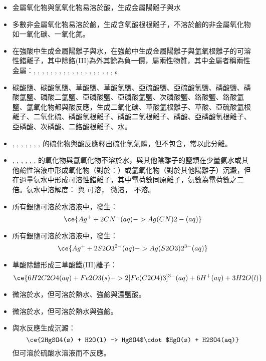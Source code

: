 \documentclass[a4paper,12pt]{report}
\begin{document}
\begin{itemize}
\item 金屬氧化物與氫氧化物易溶於酸，生成金屬陽離子與水
\item 多數非金屬氧化物易溶於鹼，生成含氧酸根根離子，不溶於鹼的非金屬氧化物如一氧化碳、一氧化氮。
\item 在強酸中生成金屬陽離子與水，在強鹼中生成金屬陽離子與氫氧根離子的可溶性錯離子，其中除鉻(III)為外其餘為負一價，屬兩性物質，其中金屬者稱兩性金屬：, , , , , , , , , , , , , , , , , , , 。
\item 碳酸鹽、碳酸氫鹽、草酸鹽、草酸氫鹽、亞硫酸鹽、亞硫酸氫鹽、磷酸鹽、磷酸氫鹽、磷酸二氫鹽、亞磷酸鹽、亞磷酸氫鹽、次磷酸鹽、鉻酸鹽、鉻酸氫鹽、氫氧化物都與酸反應，生成二氧化碳、草酸氫根離子、草酸、亞硫酸氫根離子、二氧化硫、磷酸氫根離子、磷酸二氫根離子、磷酸、亞磷酸氫根離子、亞磷酸、次磷酸、二鉻酸根離子、水。
\item {}, , , , , , ,  的硫化物與酸反應釋出硫化氫氣體，但不包含，常以此分離。
\item {}, , , , , ,  的氧化物與氫氧化物不溶於水，與其他陰離子的鹽類在少量氨水或其他鹼性溶液中形成氧化物（對於：）或氫氧化物（對於其他陽離子）沉澱，但在過量氨水中形成可溶性錯離子，其中電荷數同原離子，氨數為電荷數之二倍。氨水中溶解度： 與 可溶， 微溶， 不溶。
\item 所有銀鹽可溶於水溶液中，發生：
\[\ce{Ag^+ + 2CN^-(aq) -> Ag(CN)2-(aq)}\]
\item 所有銀鹽可溶於水溶液中，發生：
\[\ce{Ag^+ + 2S2O3^{2-}(aq) -> Ag(S2O3)2^{3-}(aq)}\]
\item 草酸除鏽形成三草酸鐵(III)離子：
\[\ce{6H2C2O4(aq) + Fe2O3(s) -> 2[Fe(C2O4)3]^{3-}(aq) + 6H^+(aq) + 3H2O(l)}\]
\item {} 微溶於水，但可溶於熱水、強鹼與濃鹽酸。
\item {} 微溶於水，但可溶於熱水與強鹼。
\item {} 與水反應生成沉澱：
\[\ce{2HgSO4(s) + H2O(l) -> HgSO4$\cdot$HgO(s) + H2SO4(aq)}\]
但可溶於硫酸水溶液而不反應。
\end{itemize}
\end{document}
